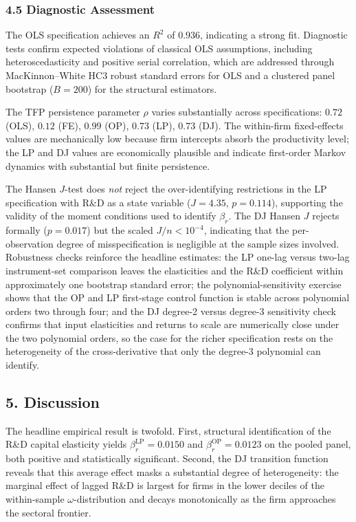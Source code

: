 \documentclass[a4paper, 12pt]{article}
\begin{document}
\subsubsection{4.5 Diagnostic Assessment}

The OLS specification achieves an $R^2$ of $0.936$, indicating a strong fit. Diagnostic tests confirm expected violations of classical OLS assumptions, including heteroscedasticity and positive serial correlation, which are addressed through MacKinnon--White HC3 robust standard errors for OLS and a clustered panel bootstrap ($B = 200$) for the structural estimators.

The TFP persistence parameter $\rho$ varies substantially across specifications: $0.72$ (OLS), $0.12$ (FE), $0.99$ (OP), $0.73$ (LP), $0.73$ (DJ). The within-firm fixed-effects values are mechanically low because firm intercepts absorb the productivity level; the LP and DJ values are economically plausible and indicate first-order Markov dynamics with substantial but finite persistence.

The Hansen $J$-test does \emph{not} reject the over-identifying restrictions in the LP specification with R\&D as a state variable ($J = 4.35$, $p = 0.114$), supporting the validity of the moment conditions used to identify $\beta_r$. The DJ Hansen $J$ rejects formally ($p = 0.017$) but the scaled $J/n < 10^{-4}$, indicating that the per-observation degree of misspecification is negligible at the sample sizes involved. Robustness checks reinforce the headline estimates: the LP one-lag versus two-lag instrument-set comparison leaves the elasticities and the R\&D coefficient within approximately one bootstrap standard error; the polynomial-sensitivity exercise shows that the OP and LP first-stage control function is stable across polynomial orders two through four; and the DJ degree-2 versus degree-3 sensitivity check confirms that input elasticities and returns to scale are numerically close under the two polynomial orders, so the case for the richer specification rests on the heterogeneity of the cross-derivative that only the degree-3 polynomial can identify.

\subsection{5. Discussion}

The headline empirical result is twofold. First, structural identification of the R\&D capital elasticity yields $\beta_r^{\text{LP}} = 0.0150$ and $\beta_r^{\text{OP}} = 0.0123$ on the pooled panel, both positive and statistically significant. Second, the DJ transition function reveals that this average effect masks a substantial degree of heterogeneity: the marginal effect of lagged R\&D is largest for firms in the lower deciles of the within-sample $\omega$-distribution and decays monotonically as the firm approaches the sectoral frontier.
\end{document}
